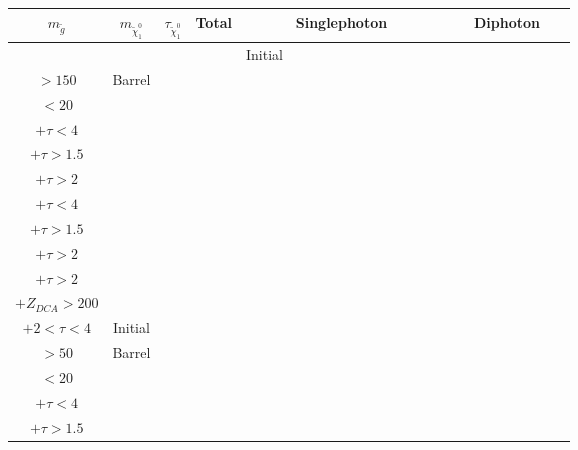 \documentclass[8pt]{extarticle}
\begin{document}
\begin{longtable}{|c|c|c|c|c|c|c|c|c|c|c|c|c|c|c|c|c|c|c|c|c|c|c|c|c|}
\hline 
$m_{\tilde{g}}$ & $m_{\tilde{\chi}_1^0}$ & $\tau_{\tilde{\chi}_1^0}$ & Total & \multicolumn{12}{|c|}{Singlephoton} & \multicolumn{9}{|c|}{Diphoton} \\ 
\hline 
 & & & & Initial & \begin{tabular}{@{}c@{}} $p_T$ \\ $> 150$\end{tabular} & Barrel & \begin{tabular}{@{}c@{}} $E_T^{miss}$ \\ $< 20$\end{tabular} & \begin{tabular}{@{}c@{}} $E_T^{miss} > 75$ \\ $+ \tau < 4$\end{tabular} & \begin{tabular}{@{}c@{}} $E_T^{miss} > 75$ \\ $+ \tau > 1.5$ \end{tabular} & \begin{tabular}{@{}c@{}} $E_T^{miss} > 75$ \\ $+ \tau > 2$ \end{tabular} & \begin{tabular}{@{}c@{}} $E_T^{miss} > 200$ \\ $+ \tau < 4$\end{tabular} & \begin{tabular}{@{}c@{}} $E_T^{miss} > 200$ \\ $+ \tau > 1.5$ \end{tabular} & \begin{tabular}{@{}c@{}} $E_T^{miss} > 200$ \\ $+ \tau > 2$ \end{tabular} & \begin{tabular}{@{}c@{}} $E_T^{miss} > 200$ \\ $+ \tau > 2$ \\ $+Z_{DCA} > 200$\end{tabular} & \begin{tabular}{@{}c@{}} $E_{T}^{miss} > 200$ \\ $+ 2 < \tau < 4$ \end{tabular} & Initial & \begin{tabular}{@{}c@{}} $p_T$ \\ $> 50$\end{tabular} & Barrel & \begin{tabular}{@{}c@{}} $E_T^{miss}$ \\ $< 20$\end{tabular} & \begin{tabular}{@{}c@{}} $E_T^{miss} > 75$ \\ $+ \tau < 4$\end{tabular} & \begin{tabular}{@{}c@{}} $E_T^{miss} > 75$ \\ $+ \tau > 1.5$\end{tabular} & \begin{tabular}{@{}c@{}} $E_T^{miss} > 75$ 
\end{longtable}
\end{document}
